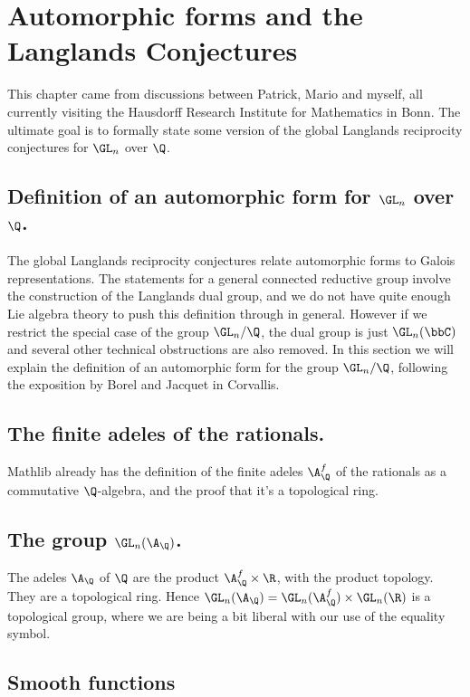 \chapter{Automorphic forms and the Langlands Conjectures}

This chapter came from discussions between Patrick, Mario and myself, all currently
visiting the Hausdorff Research Institute for
Mathematics in Bonn. The ultimate goal is to formally state some version of the global Langlands
reciprocity conjectures for $\GL_n$ over $\Q$.

\section[Definition of an automorphic form]{Definition of an automorphic form for $\GL_n$ over $\Q$.}

The global Langlands reciprocity conjectures relate automorphic forms to Galois representations.
The statements for a general connected reductive group involve the construction of the Langlands
dual group, and we do not have quite enough Lie algebra theory to push this definition through
in general. However if we restrict the special case of the group $\GL_n/\Q$, the dual group
is just $\GL_n(\bbC)$ and several other technical obstructions are also removed. In this
section we will explain the definition of an automorphic form for the group $\GL_n/\Q$, following
the exposition by Borel and Jacquet in Corvallis.

\section{The finite adeles of the rationals.}

Mathlib already has the definition of the finite adeles $\A_{\Q}^f$ of the rationals as a
commutative $\Q$-algebra, and the proof that it's a topological ring.

\section[The adelic general linear group]{The group $\GL_n(\A_{\Q})$.}

The adeles $\A_{\Q}$ of $\Q$ are the product $\A_{\Q}^f\times\R$, with the product topology.
They are a topological ring. Hence $\GL_n(\A_{\Q})=\GL_n(\A_{\Q}^f)\times\GL_n(\R)$ is a
topological group, where we are being a bit liberal with our use of the equality symbol.

\section{Smooth functions}

